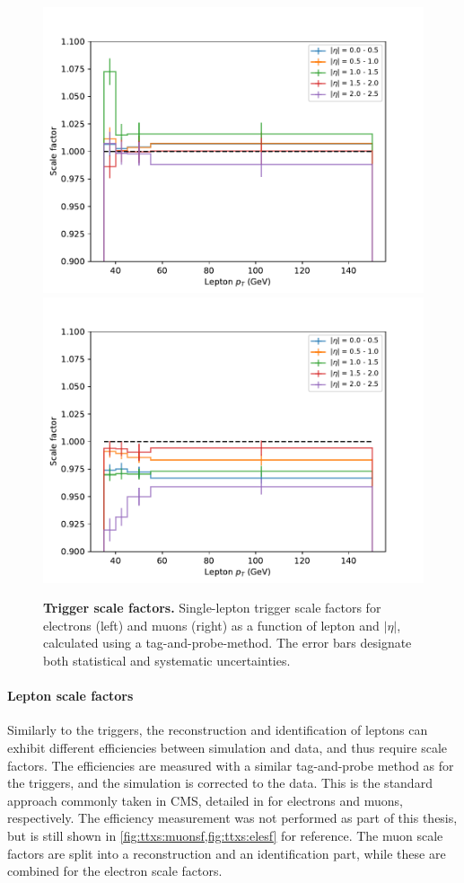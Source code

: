 \begin{figure}[t]
    \centering
    \includegraphics[width=0.49 \textwidth]{figures/ttxs/scalefactors/triggersf_ele.pdf}
    \hfill
    \includegraphics[width=0.49 \textwidth]{figures/ttxs/scalefactors/triggersf_muon.pdf}
    \caption{\textbf{Trigger scale factors.} Single-lepton trigger scale factors for electrons (left) and muons (right) as a function of lepton \pt and $|\eta|$, calculated using a tag-and-probe-method. The error bars designate both statistical and systematic uncertainties. }
    \label{fig:ttxs:triggersf}
\end{figure}

\paragraph{Lepton scale factors}

Similarly to the triggers, the reconstruction and identification of leptons can exhibit different efficiencies between simulation and data, and thus require scale factors. 
The efficiencies are measured with a similar tag-and-probe method as for the triggers, and the simulation is corrected to the data. This is the standard approach commonly taken in CMS, detailed in  for electrons and muons, respectively.%
The efficiency measurement was not performed as part of this thesis, but is still shown in \cref{fig:ttxs:muonsf,fig:ttxs:elesf} for reference. The muon scale factors are split into a reconstruction and an identification part, while these are combined for the electron scale factors.  


